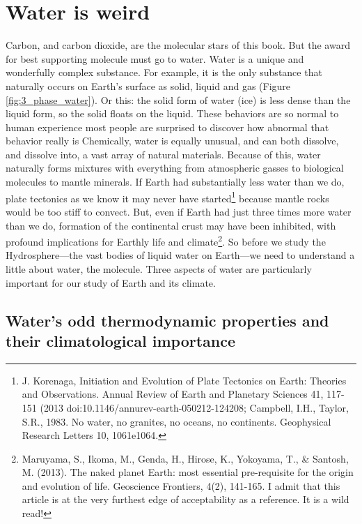 \section{Water is weird} \label{Water is Weird}
Carbon, and carbon dioxide, are the molecular stars of this book. But the award for best supporting molecule must go to water. Water is a unique and wonderfully complex substance. For example, it is the only substance that naturally occurs on Earth's surface as solid, liquid and gas (Figure \ref{fig:3_phase_water}). Or this: the solid form of water (ice) is less dense than the liquid form, so the solid floats on the liquid. These behaviors are so normal to human experience most people are surprised to discover how abnormal that behavior really is Chemically, water is equally unusual, and can both dissolve, and dissolve into, a vast array of natural materials. Because of this, water naturally forms mixtures with everything from atmospheric gasses to biological molecules to mantle minerals. If Earth had substantially less water than we do, plate tectonics as we know it may never have started\footnote{J. Korenaga, Initiation and Evolution of Plate Tectonics on Earth: Theories and Observations. Annual Review of Earth and Planetary Sciences 41, 117-151 (2013 doi:10.1146/annurev-earth-050212-124208; Campbell, I.H., Taylor, S.R., 1983. No water, no granites, no oceans, no continents. Geophysical Research Letters 10, 1061e1064.} because mantle rocks would be too stiff to convect. But, even if Earth had just three times more water than we do, formation of the continental crust may have been inhibited, with profound implications for Earthly life and climate\footnote{Maruyama, S., Ikoma, M., Genda, H., Hirose, K., Yokoyama, T., \& Santosh, M. (2013). The naked planet Earth: most essential pre-requisite for the origin and evolution of life. Geoscience Frontiers, 4(2), 141-165. I admit that this article is at the very furthest edge of acceptability as a reference. It is a wild read!}. So before we study the Hydrosphere---the vast bodies of liquid water on Earth---we need to understand a little about water, the molecule. Three aspects of water are particularly important for our study of Earth and its climate. 
\subsection{Water's odd thermodynamic properties and their climatological importance}
